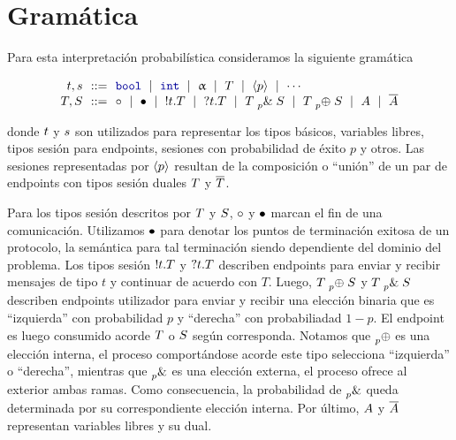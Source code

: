\section{Gramática}

Para esta interpretación probabilística consideramos la siguiente gramática

\[
\begin{array}{@{}r@{~~}c@{~~}l@{}}
\TypeT, \TypeS & ::= &
\tbool
\rulemid \tint
\rulemid \tvar
\rulemid \SessionType
\rulemid \ClosedSessionType
\rulemid \cdots
\\
\SessionTypeT, \SessionTypeS & ::= &
\tend
\rulemid \tdone
\rulemid \cout\Type\SessionType
\rulemid \cin\Type\SessionType
\rulemid \tbranch[p]\SessionTypeT\SessionTypeS
\rulemid \tchoice[p]\SessionTypeT\SessionTypeS
\rulemid \etvar
\rulemid \dual\etvar
\end{array}
\]

donde $\TypeT$ y $\TypeS$ son utilizados para representar los tipos básicos,
variables libres, tipos sesión para endpoints, sesiones con probabilidad de
éxito $p$ y otros. Las sesiones representadas por $\ClosedSessionType$ resultan
de la composición o ``unión'' de un par de endpoints con tipos sesión duales
$\SessionTypeT$ y $\dual\SessionTypeT$.

Para los tipos sesión descritos por $\SessionTypeT$ y $\SessionTypeS$, $\tend$
y $\tdone$ marcan el fin de una comunicación. Utilizamos $\tdone$ para denotar
los puntos de terminación exitosa de un protocolo, la semántica para tal
terminación siendo dependiente del dominio del problema. Los tipos sesión
$\cout\Type\SessionType$ y $\cin\Type\SessionType$ describen endpoints para
enviar y recibir mensajes de tipo $t$ y continuar de acuerdo con $T$. Luego,
$\tchoice[p]\SessionTypeT\SessionTypeS$ y
$\tbranch[p]\SessionTypeT\SessionTypeS$ describen endpoints utilizador para
enviar y recibir una elección binaria que es ``izquierda'' con probabilidad $p$
y ``derecha'' con probabiliadad $1 - p$. El endpoint es luego consumido acorde
$\SessionTypeT$ o $\SessionTypeS$ según corresponda. Notamos que $\tchoice{}{}$
es una elección interna, el proceso comportándose acorde este tipo selecciona
``izquierda'' o ``derecha'', mientras que $\tbranch{}{}$ es una elección
externa, el proceso ofrece al exterior ambas ramas. Como consecuencia, la
probabilidad de $\tbranch{}{}$ queda determinada por su correspondiente
elección interna. Por último, $\etvar$ y $\dual\etvar$ representan variables
libres y su dual.
